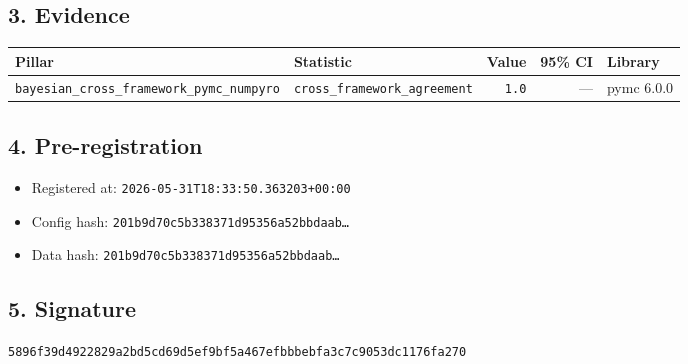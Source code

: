 \documentclass{article}
\begin{document}
\subsection*{3. Evidence}
\begin{tabular}{llrrl}\toprule
\textbf{Pillar} & \textbf{Statistic} & \textbf{Value} & \textbf{95\% CI} & \textbf{Library} \\\midrule
\texttt{bayesian\_cross\_framework\_pymc\_numpyro} & \texttt{cross\_framework\_agreement} & \texttt{1.0} & --- & pymc 6.0.0 \\
\bottomrule\end{tabular}
\subsection*{4. Pre-registration}
\begin{itemize}
\item Registered at: \texttt{2026-05-31T18:33:50.363203+00:00}
\item Config hash: \texttt{201b9d70c5b338371d95356a52bbdaab\dots}
\item Data hash: \texttt{201b9d70c5b338371d95356a52bbdaab\dots}
\end{itemize}
\subsection*{5. Signature}
\texttt{5896f39d4922829a2bd5cd69d5ef9bf5a467efbbbebfa3c7c9053dc1176fa270}\\
\end{document}
